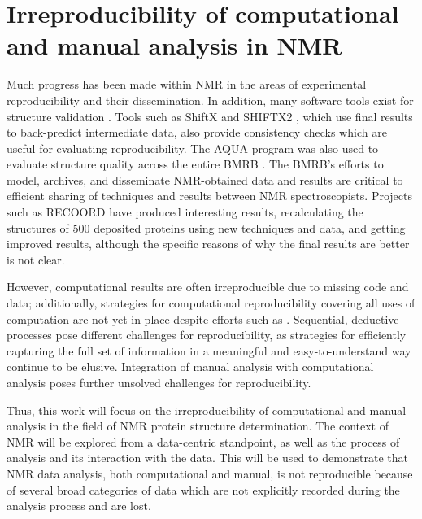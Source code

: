 \section{Irreproducibility of computational and manual analysis in NMR}
Much progress has been made within NMR in the areas of experimental
reproducibility and their dissemination.  In addition, many software tools
exist for structure validation 
\cite{doreleijers2012nrg, laskowski1996aqua, bhattacharya2007evaluating}.
Tools such as ShiftX and SHIFTX2 \cite{shiftx, shiftx2}, which use final 
results to back-predict intermediate data, also provide consistency checks 
which are useful for evaluating reproducibility.  The AQUA 
\cite{laskowski1996aqua} program was also used to evaluate structure quality 
across the entire BMRB \cite{doreleijers1998quality}.  The BMRB's efforts to 
model, archives, and disseminate NMR-obtained data and results are critical 
to efficient sharing of techniques and results between NMR spectroscopists.
Projects such as RECOORD \cite{nederveen2005recoord} have produced interesting
results, recalculating the structures of 500 deposited proteins using new 
techniques and data, and getting improved results, although the specific
reasons of why the final results are better is not clear.

However, computational results are often irreproducible due to missing code and 
data; additionally, strategies for computational reproducibility covering all 
uses of computation are not yet in place despite efforts such as 
\cite{donoho2009, peng2011reproducible}.
Sequential, deductive processes pose different challenges for reproducibility,
as strategies for efficiently capturing the full set of information in a 
meaningful and easy-to-understand way continue to be elusive.  Integration
of manual analysis with computational analysis poses further unsolved
challenges for reproducibility.

Thus, this work will focus on the irreproducibility of computational and manual
analysis in the field of NMR protein structure determination.
The context of NMR will be explored from a data-centric standpoint, as well as
the process of analysis and its interaction with the data.
This will be used to demonstrate that NMR data analysis, both computational
and manual, is not reproducible
because of several broad categories of data which are not explicitly 
recorded during the analysis process and are lost.


